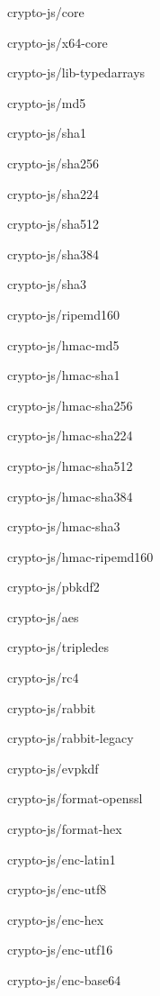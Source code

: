 \begin{DoxyItemize}
\item {\ttfamily crypto-\/js/core}
\item {\ttfamily crypto-\/js/x64-\/core}
\item {\ttfamily crypto-\/js/lib-\/typedarrays} 


\item {\ttfamily crypto-\/js/md5}
\item {\ttfamily crypto-\/js/sha1}
\item {\ttfamily crypto-\/js/sha256}
\item {\ttfamily crypto-\/js/sha224}
\item {\ttfamily crypto-\/js/sha512}
\item {\ttfamily crypto-\/js/sha384}
\item {\ttfamily crypto-\/js/sha3}
\item {\ttfamily crypto-\/js/ripemd160} 


\item {\ttfamily crypto-\/js/hmac-\/md5}
\item {\ttfamily crypto-\/js/hmac-\/sha1}
\item {\ttfamily crypto-\/js/hmac-\/sha256}
\item {\ttfamily crypto-\/js/hmac-\/sha224}
\item {\ttfamily crypto-\/js/hmac-\/sha512}
\item {\ttfamily crypto-\/js/hmac-\/sha384}
\item {\ttfamily crypto-\/js/hmac-\/sha3}
\item {\ttfamily crypto-\/js/hmac-\/ripemd160} 


\item {\ttfamily crypto-\/js/pbkdf2} 


\item {\ttfamily crypto-\/js/aes}
\item {\ttfamily crypto-\/js/tripledes}
\item {\ttfamily crypto-\/js/rc4}
\item {\ttfamily crypto-\/js/rabbit}
\item {\ttfamily crypto-\/js/rabbit-\/legacy}
\item {\ttfamily crypto-\/js/evpkdf} 


\item {\ttfamily crypto-\/js/format-\/openssl}
\item {\ttfamily crypto-\/js/format-\/hex} 


\item {\ttfamily crypto-\/js/enc-\/latin1}
\item {\ttfamily crypto-\/js/enc-\/utf8}
\item {\ttfamily crypto-\/js/enc-\/hex}
\item {\ttfamily crypto-\/js/enc-\/utf16}
\item {\ttfamily crypto-\/js/enc-\/base64} 



\end{DoxyItemize}
